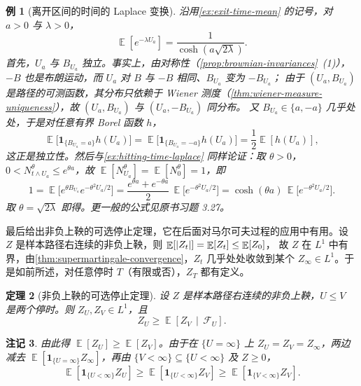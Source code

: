 \documentclass[UTF8,11pt,a4paper,oneside,fontset=fandol]{ctexrep}
\numberwithin{equation}{section}
\theoremstyle{zhthm}
\newtheorem{theorem}{定理}[section]
\newtheorem{example}[theorem]{例}
\newtheorem{remark}[theorem]{注记}
\newcommand{\F}{\mathcal{F}}
\DeclareMathOperator{\E}{\mathbb{E}}
\newcommand{\ind}[1]{\mathbf{1}_{#1}}
\newcommand{\Econd}[2]{%
  \E\!\left[#1\,\middle|\,#2\right]}
\DeclarePairedDelimiter{\abs}{\lvert}{\rvert}
\begin{document}
\begin{example}[离开区间的时间的 Laplace 变换]
\label{ex:exit-time-laplace}
沿用\cref{ex:exit-time-mean} 的记号，对 $a>0$ 与 $\lambda>0$，
\[
  \E[e^{-\lambda U_a}]=\frac{1}{\cosh(a\sqrt{2\lambda})}.
\]
首先，$U_a$ 与 $B_{U_a}$ 独立。事实上，由对称性（\cref{prop:brownian-invariances}~(1)），$-B$ 也是布朗运动，而 $U_a$ 对 $B$ 与 $-B$ 相同、$B_{U_a}$ 变为 $-B_{U_a}$；
由于 $(U_a,B_{U_a})$ 是路径的可测函数，其分布只依赖于 Wiener 测度（\cref{thm:wiener-measure-uniqueness}），故 $(U_a,B_{U_a})$ 与 $(U_a,-B_{U_a})$ 同分布。
又 $B_{U_a}\in\{a,-a\}$ 几乎处处，于是对任意有界 Borel 函数 $h$，
\[
  \E\bigl[\ind{\{B_{U_a}=a\}}h(U_a)\bigr]=\E\bigl[\ind{\{B_{U_a}=-a\}}h(U_a)\bigr]=\frac12\E[h(U_a)],
\]
这正是独立性。然后与\cref{ex:hitting-time-laplace} 同样论证：取 $\theta>0$，$0<N^\theta_{t\wedge U_a}\le e^{\theta a}$，故 $\E[N^\theta_{U_a}]=\E[N^\theta_0]=1$，即
\[
  1=\E\bigl[e^{\theta B_{U_a}}e^{-\theta^2U_a/2}\bigr]=\frac{e^{\theta a}+e^{-\theta a}}{2}\,\E\bigl[e^{-\theta^2U_a/2}\bigr]=\cosh(\theta a)\,\E\bigl[e^{-\theta^2U_a/2}\bigr].
\]
取 $\theta=\sqrt{2\lambda}$ 即得。更一般的公式见原书习题 3.27。
\end{example}

最后给出非负上鞅的可选停止定理，它在后面对马尔可夫过程的应用中有用。设 $Z$ 是样本路径右连续的非负上鞅，则 $\E[\abs{Z_t}]=\E[Z_t]\le\E[Z_0]$，
故 $Z$ 在 $L^1$ 中有界，由\cref{thm:supermartingale-convergence}，$Z_t$ 几乎处处收敛到某个 $Z_\infty\in L^1$。于是如前所述，对任意停时 $T$（有限或否），$Z_T$ 都有定义。

\begin{theorem}[非负上鞅的可选停止定理]
\label{thm:optional-stopping-nonnegative-supermartingale}
设 $Z$ 是样本路径右连续的非负上鞅，$U\le V$ 是两个停时。则 $Z_U,Z_V\in L^1$，且
\[
  Z_U\ge\Econd{Z_V}{\F_U}.
\]
\end{theorem}

\begin{remark}
\label{rem:optional-stopping-nonnegative-supermartingale}
由此得 $\E[Z_U]\ge\E[Z_V]$。由于在 $\{U=\infty\}$ 上 $Z_U=Z_V=Z_\infty$，两边减去 $\E[\ind{\{U=\infty\}}Z_\infty]$，再由 $\{V<\infty\}\subseteq\{U<\infty\}$ 及 $Z\ge0$，
\[
  \E[\ind{\{U<\infty\}}Z_U]\ge\E[\ind{\{U<\infty\}}Z_V]\ge\E[\ind{\{V<\infty\}}Z_V].
\]
\end{remark}
\end{document}
